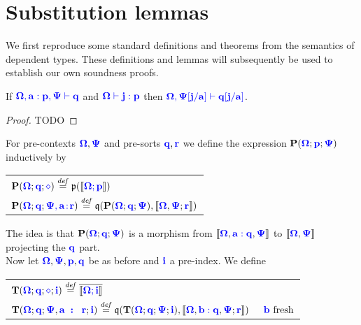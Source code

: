 \documentclass[sigplan,10pt,review,anonymous]{acmart}
\newcommand{\blu}[1]{\textbf{\color{blue}{#1}}}
\newcommand{\blum}[1]{\mathbf{\color{blue}{#1}}}
\newcommand{\defeq}{\overset{\mathit{def}}{=}}
\newcommand{\sem}[1]{\llbracket #1 \rrbracket}
\newcommand{\mbf}[1]{\mathbf{#1}}
\begin{document}
\section{Substitution lemmas}

We first reproduce some standard definitions and theorems from the semantics of dependent types. These definitions and lemmas will subsequently be used to establish our own soundness proofs.

\begin{lemma}
\label{lemma:indsortsub-syntax}
If $\blum{\Omega, a:p,\Psi \vdash q}$ and $\blum{\Omega \vdash j : p}$ then $\blum{\Omega, \Psi[j/a] \vdash q[j/a]}$.
\end{lemma}

\begin{proof}
TODO
\end{proof} 
For pre-contexts $\blum{\Omega},\blum{\Psi}$ and pre-sorts $\blum{q},\blum{r}$ we define the expression $\mbf{P}(\blum{\Omega};\blum{p};\blum{\Psi})$ inductively by
\begin{center}

\begin{tabular}{l}
$\mbf{P}(\blum{\Omega}; \blum{q}; \blum{\diamond}) \defeq \frak p(\sem{\blum{\Omega; p}})$\\
$\mbf{P}(\blum{\Omega}; \blum{q}; \blum{\Psi,a \! : \! r}) \defeq \frak q (\mbf{P}(\blum{\Omega} ; \blum{q} ; \blum{\Psi}),\sem{\blum{\Omega},\blum{\Psi};\blum{r}})$
\end{tabular}
\end{center}

The idea is that $\mbf{P}(\blum{\Omega} ; \blum{q} ; \blum{\Psi})$ is a morphism from $\sem{\blum{\Omega}, \blum{a : q}, \blum{\Psi}}$ to $\sem{\blum{\Omega},\blum{\Psi}}$ projecting the $\blum{q}$ part. \\

Now let $\blum{\Omega},\blum{\Psi},\blum{p},\blum{q}$ be as before and $\blum{i}$ a pre-index. We define

\begin{center}
\begin{tabular}{l}
$\mbf{T}(\blum{\Omega};\blum{q};\blum{\blum{\diamond}};\blu{i}) \defeq \overline{\sem{\blum{\Omega;i}}}$\\
$\mbf{T}(\blum{\Omega};\blum{q};\blum{\Psi},\blu{a \! : \! r};\blum{i}) \defeq \frak q (\mbf{T}(\blum{\Omega};\blum{q};\blum{\Psi};\blum{i}), \sem{\blum{\Omega},\blum{b : q}, \blum{\Psi}; \blu{r}}) \hspace{3.5ex} \blum{b} \text{ fresh}$
\end{tabular}
\end{center}
\end{document}
